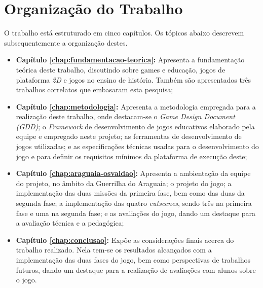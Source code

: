 \section{Organização do Trabalho}
\label{sec:organizacaotrabalho}

O trabalho está estruturado em cinco capítulos. Os tópicos abaixo descrevem subsequentemente a organização destes.

\begin{itemize}
			
	\item \textbf{Capítulo \ref{chap:fundamentacao-teorica}:} Apresenta a fundamentação teórica deste trabalho, discutindo sobre games e educação, jogos de plataforma \textit{2D} e jogos no ensino de história. Também são apresentados três trabalhos correlatos que embasaram esta pesquisa;
	
	\item \textbf{Capítulo \ref{chap:metodologia}:} Apresenta a metodologia empregada para a realização deste trabalho, onde destacam-se o \textit{Game Design Document (GDD)}; o \textit{Framework} de desenvolvimento de jogos educativos elaborado pela equipe e empregado neste projeto; as ferramentas de desenvolvimento de jogos utilizadas; e as especificações técnicas usadas para o desenvolvimento do jogo e para definir os requisitos mínimos da plataforma de execução deste;
	
	\item \textbf{Capítulo \ref{chap:araguaia-osvaldao}:} Apresenta a ambientação da equipe do projeto, no âmbito da Guerrilha do Araguaia; o projeto do jogo; a implementação das duas missões da primeira fase, bem como das duas da segunda fase; a implementação das quatro \textit{cutscenes}, sendo três na primeira fase e uma na segunda fase; e as avaliações do jogo, dando um destaque para a avaliação técnica e a pedagógica;
	
	\item \textbf{Capítulo \ref{chap:conclusao}:} Expõe as considerações finais acerca do trabalho realizado. Nela tem-se os resultados alcançados com a implementação das duas fases do jogo, bem como perspectivas de trabalhos futuros, dando um destaque para a realização de avaliações com alunos sobre o jogo.
	
\end{itemize}
